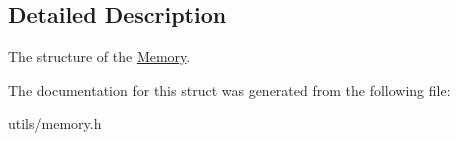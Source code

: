 \subsection{Detailed Description}
The structure of the \hyperlink{structMemory}{Memory}. 

The documentation for this struct was generated from the following file\+:\begin{DoxyCompactItemize}
\item 
utils/memory.\+h\end{DoxyCompactItemize}
